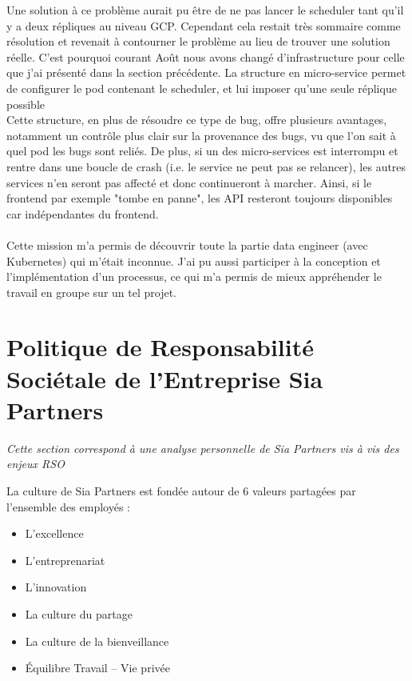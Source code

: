 \documentclass{article} %
\begin{document}
Une solution à ce problème aurait pu être de ne pas lancer le scheduler tant qu'il y a deux répliques au niveau GCP. Cependant cela restait très sommaire comme résolution et revenait à contourner le problème au lieu de trouver une solution réelle. C'est pourquoi courant Août nous avons changé d'infrastructure pour celle que j'ai présenté dans la section précédente. La structure en micro-service permet de configurer le pod contenant le scheduler, et lui imposer qu'une seule réplique possible\\

Cette structure, en plus de résoudre ce type de bug, offre plusieurs avantages, notamment un contrôle plus clair sur la provenance des bugs, vu que l'on sait à quel pod les bugs sont reliés. De plus, si un des micro-services est interrompu et rentre dans une boucle de crash (i.e. le service ne peut pas se relancer), les autres services n'en seront pas affecté et donc continueront à marcher. Ainsi, si le frontend par exemple "tombe en panne", les API resteront toujours disponibles car indépendantes du frontend.\\ \\

Cette mission m'a permis de découvrir toute la partie data engineer (avec Kubernetes) qui m'était inconnue. J'ai pu aussi participer à la conception et l'implémentation d'un processus, ce qui m'a permis de mieux appréhender le travail en groupe sur un tel projet.


\newpage

\section{Politique de Responsabilité Sociétale de l’Entreprise Sia Partners}
\textit{Cette section correspond à une analyse personnelle de Sia Partners vis à vis des enjeux RSO}

La culture de Sia Partners est fondée autour de 6 valeurs partagées par l’ensemble des employés :
\begin{itemize}
	\item L’excellence
	\item L'entreprenariat
	\item L’innovation
	\item La culture du partage
	\item La culture de la bienveillance
	\item Équilibre Travail – Vie privée
\end{itemize}
\end{document}
